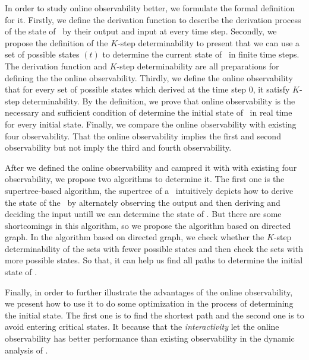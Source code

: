 In order to study online observability better, we formulate the formal definition for it. Firstly, we define the derivation function to describe the derivation process of the state of \BCNs\ by their output and input at every time step. Secondly, we propose the definition of the $K$-step determinability to present that we can use a set of possible states \Ustate$(t)$ to determine the current state of \BCNs\ in finite time steps. The derivation function and $K$-step determinability are all preparations for defining the the online observability. Thirdly, we define the online observability that for every set of possible states which derived at the time step $0$, it satisfy $K$-step determinability. By the definition, we prove that online observability is the necessary and sufficient condition of determine the initial state of \BCNs\ in real time for every initial state. Finally, we compare the online observability with existing four observability. That the online observability implies the first and second observability but not imply the third and fourth observability.

After we defined the online observability and campred it with with existing four observability, we propose two algorithms to determine it. The first one is the supertree-based algorithm, the supertree of a \BCN\ intuitively depicts how to derive the state of the \BCN\ by alternately observing the output and then deriving and deciding the input untill we can determine the state of \BCN. But there are some shortcomings in this algorithm, so we propose the algorithm based on directed graph. In the algorithm based on directed graph, we check whether the $K$-step determinability of the sets with fewer possible states and then check the sets with more possible states. So that, it can help us find all paths to determine the initial state of \BCNs.

Finally, in order to further illustrate the advantages of the online observability, we present how to use it to do some optimization in the process of determining the initial state. The first one is to find the shortest path and the second one is to avoid entering critical states. It because that the {\em interactivity} let the online observability has better performance than existing observability in the dynamic analysis of \BCNs.

